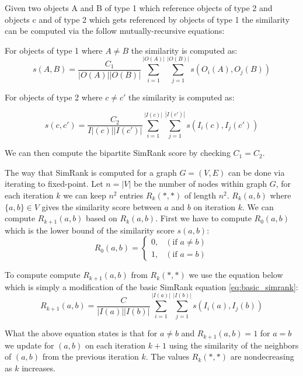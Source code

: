 \begin{definition}\label{def:bipartite_simrank} Given two objects A and B of type 1 which reference objects of type 2 and objects c and of type 2 which gets referenced by objects of type 1 the similarity can be computed via the follow mutually-recursive equations:
	
	For objects of type 1 where $A \neq B$ the similarity is computed as:
	\begin{equation}\label{eq:bipartite_simrank1}
	s(A,B)= \frac{C_1}{|O(A)||O(B)|}\sum^{|O(A)|}_{i=1}\sum^{|O(B)|}_{j=1}s(O_i(A),O_j(B))
	\end{equation}
	
	For objects of type 2 where $c \neq c'$ the similarity is computed as:

	\begin{equation}\label{eq:bipartite_simrank2}
	s(c,c')= \frac{C_2}{I|(c)||I(c')|}\sum^{|I(c)|}_{i=1}\sum^{|I(c')|}_{j=1}s(I_i(c),I_j(c'))
	\end{equation}
	
	We can then compute the bipartite SimRank score by checking $C_1 = C_2$\cite{10.1145/775047.775126}.
\end{definition}

The way that SimRank is computed for a graph $G = (V,E)$ can be done via iterating to fixed-point. Let $n = |V|$ be the number of nodes within graph $G$, for each iteration $k$ we can keep $n^2$ entries $R_k(*,*)$ of length $n^2$. $R_k(a,b)$ where $\{a,b\} \in V$ gives the similarity score between $a$ and $b$ on iteration $k$\cite{10.1145/775047.775126}. We can compute $R_{k+1}(a,b)$ based on $R_k(a,b)$. First we have to compute $R_0(a,b)$ which is the lower bound of the similarity score $s(a,b)$:
\begin{equation}\label{eq:lowerbound_sim_score}
R_0(a,b)= \begin{cases}
0, & (\text{if } a \neq b) \\

1 ,& (\text{if } a = b)
\end{cases}
\end{equation}

To compute compute $R_{k+1}(a,b)$ from $R_k(*,*)$ we use the equation below which is simply a modification of the basic SimRank equation \ref{eq:basic_simrank}:
\begin{equation}\label{eq:simrank_computation}
R_{k+1}(a,b)= \frac{C}{|I(a)||I(b)|}\sum^{|I(a)|}_{i=1}\sum^{|I(b)|}_{j=1}s(I_i(a),I_j(b))
\end{equation}

What the above equation states is that for $a \neq b$ and $R_{k+1}(a,b) = 1$ for $a = b$ we update for $(a,b)$ on each iteration $k+1$ using the similarity of the neighbors of $(a,b)$ from the previous iteration $k$. The values $R_k(*,*)$ are nondecreasing as $k$ increases. 
